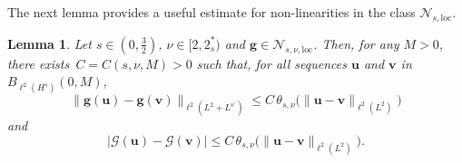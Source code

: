 \documentclass[12pt,a4paper]{amsart}
\newtheorem{lemma}[theorem]{Lemma}
\numberwithin{equation}{section}
\newcommand{\ulu}{\boldsymbol{u}}
\newcommand{\ulv}{\boldsymbol{v}}
\newcommand{\ulg}{\boldsymbol{g}}
\newcommand{\twoasts}{{2^*_s}}
\newcommand{\Nloc}{\mathscr{N}_{s,\mathrm{loc}}}
\newcommand{\Nlocnu}{\mathscr{N}_{s,\nu,\mathrm{loc}}}
\newcommand{\thetasnu}{\theta_{s,\nu}}
\begin{document}
	The next lemma provides a useful estimate for non-linearities in the class $\Nloc$.
	
	\begin{lemma}\label{lem:hoelder-regularity-non-linearity}Let $s\in(0,\frac32)$, $\nu\in[2,\twoasts)$ and $\ulg\in\Nlocnu$. 
		Then, for any $M>0$, there exists~$C=C(s,\nu,M)>0$
		such that, for all sequences $ \ulu$ and $\ulv$ in $B_{\ell^2(H^{s})}(0,M)$,
		\begin{equation}\label{est:Lnu_L2_norms}
			\| \ulg (\ulu) -\ulg (\ulv) \|_{\ell^2(L^2+L^{\nu^\prime})} \leq C \, \thetasnu \big(\| \ulu-\ulv \|_{\ell^2(L^2)}\big)
		\end{equation}
		and
		\begin{equation}\label{est:nonlinear_energy_L2}
			| \mathscr{G}(\ulu) - \mathscr{G}(\ulv) | \leq C \, \thetasnu \big(\| \ulu-\ulv \|_{\ell^2(L^2)}\big) .
		\end{equation}
	\end{lemma}
\end{document}
